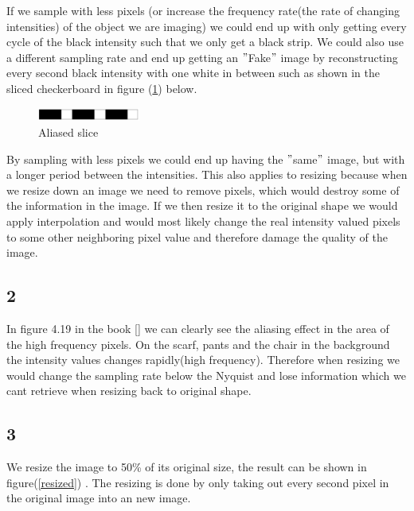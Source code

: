 {If we sample with less pixels (or increase the frequency rate(the rate of changing intensities) of the object we are imaging) we could end up with only getting every cycle of the black intensity such that we only get a black strip. We could also use a different sampling rate and end up getting an $"$Fake$"$ image by reconstructing every second black intensity with one white in between such as shown in the sliced checkerboard in figure (\ref{checker3}) below.
\begin{figure}[!htb]
    {\centering
        \includegraphics[width=0.30\textwidth]{checker3.png}
        \caption{Aliased slice}
        \label{checker3}
    \par}
    \end{figure}
By sampling with less pixels we could end up having the $"$same$"$ image, but with a longer period between the intensities. This also applies to resizing because when we resize down an image we need to remove pixels, which would destroy some of the information in the image. If we then resize it to the original shape we would apply interpolation and would most likely change the real intensity valued pixels to some other neighboring pixel value and therefore damage the quality of the image.

\subsection{2}

In figure 4.19 in the book [\cite{dip}] we can clearly see the aliasing effect in the area of the high frequency pixels. On the scarf, pants and the chair in the background the intensity values changes rapidly(high frequency). Therefore when resizing we would change the sampling rate below the Nyquist and lose information which we cant retrieve when resizing back to original shape.

\subsection{3}


We resize the image to 50\% of its original size, the result can be shown in figure(\ref{resized}) . The resizing is done by only taking out every second pixel in the original image into an new image.

}
